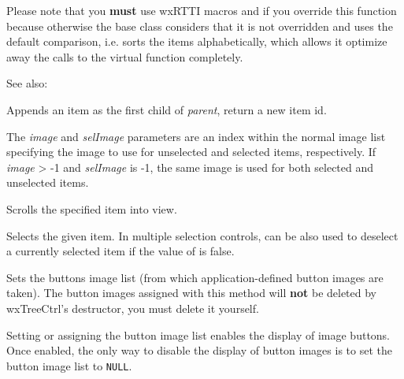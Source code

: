 Please note that you \textbf{must} use wxRTTI macros 
 and 
 if you override this
function because otherwise the base class considers that it is not overridden
and uses the default comparison, i.e. sorts the items alphabetically, which
allows it optimize away the calls to the virtual function completely.

See also: 


\label{wxtreectrlprependitem}


Appends an item as the first child of {\it parent}, return a new item id.

The {\it image} and {\it selImage} parameters are an index within
the normal image list specifying the image to use for unselected and
selected items, respectively.
If {\it image} > -1 and {\it selImage} is -1, the same image is used for
both selected and unselected items.


\label{wxtreectrlscrollto}


Scrolls the specified item into view.


\label{wxtreectrlselectitem}


Selects the given item. In multiple selection controls, can be also used to
deselect a currently selected item if the value of  is false.


\label{wxtreectrlsetbuttonsimagelist}


Sets the buttons image list (from which application-defined button images are taken).
The button images assigned with this method will
{\bf not} be deleted by wxTreeCtrl's destructor, you must delete it yourself.

Setting or assigning the button image list enables the display of image buttons.
Once enabled, the only way to disable the display of button images is to set
the button image list to {\tt NULL}.

